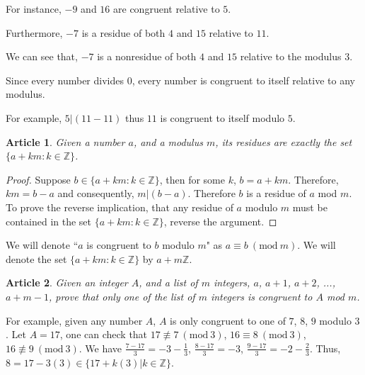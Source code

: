\documentclass{article}
\theoremstyle{problemstyle}
\newtheorem{article}{Article}
\newcommand{\Mod}[1]{\ (\mathrm{mod}\ #1)}
\begin{document}
For instance, $-9$ and $16$ are congruent relative to $5$.

Furthermore, $-7$ is a residue of both $4$ and $15$ relative to $11$.

We can see that, $-7$ is a nonresidue of both $4$ and $15$ relative to the modulus $3$.

Since every number divides $0$, every number is congruent to itself relative to any modulus.

For example, $5|(11-11)$ thus $11$ is congruent to itself modulo $5$.  

\begin{article}
Given a number $a$, and a modulus $m$, its residues are exactly the set $\{a + km : k \in \mathbb{Z}\}$.
\end{article}

\begin{proof}
Suppose $b \in \{a + km : k \in \mathbb{Z}\}$, then for some $k$, $b = a +km$. Therefore, $km = b-a$ and consequently, $m|(b-a)$. Therefore $b$ is a residue of $a$ mod $m$. To prove the reverse implication, that any residue of $a$ modulo $m$ must be contained in the set $\{a + km : k \in \mathbb{Z}\}$, reverse the argument. 
\end{proof}

We will denote ``$a$ is congruent to $b$ modulo $m$" as $a \equiv b \Mod{m}$. We will denote the set $\{a + km : k \in \mathbb{Z}\}$ by $a+m\mathbb{Z}$. 

\begin{article}
Given an integer $A$, and a list of $m$ integers, $a$, $a+1$, $a+2$, ..., $a+m-1$, prove that only one of the list of $m$ integers is congruent to $A$ mod $m$. 
\end{article}

For example, given any number $A$, $A$ is only congruent to one of $7$, $8$, $9$ modulo $3$. Let $A = 17$, one can check that $17 \not\equiv 7 \Mod{3}$, $16 \equiv 8 \Mod{3}$, $16 \not\equiv 9 \Mod{3}$. We have $\frac{7-17}{3} = -3-\frac{1}{3}$, $\frac{8-17}{3} = -3$, $\frac{9-17}{3} = -2-\frac{2}{3}$. Thus, $8 = 17-3(3) \in \{17+k(3)|k \in \mathbb{Z}\}$. 
\end{document}
